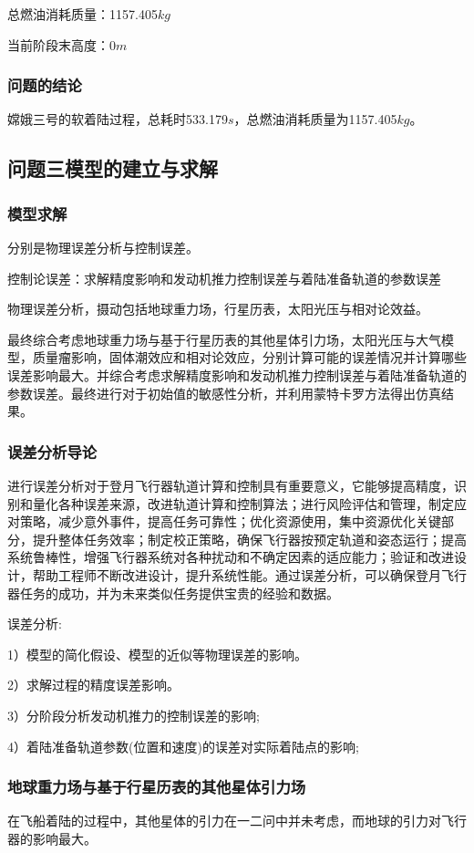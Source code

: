 \documentclass{ctexart}
\begin{document}
总燃油消耗质量：1157.405\(kg\)

当前阶段末高度：0\(m\)
\subsubsection{问题的结论}
嫦娥三号的软着陆过程，总耗时533.179\(s\)，总燃油消耗质量为1157.405\(kg\)。
    \subsection{问题三模型的建立与求解}
\subsubsection{模型求解}
分别是物理误差分析与控制误差。

控制论误差：求解精度影响和发动机推力控制误差与着陆准备轨道的参数误差

物理误差分析，摄动包括地球重力场，行星历表，太阳光压与相对论效益。

最终综合考虑地球重力场与基于行星历表的其他星体引力场，太阳光压与大气模型，质量瘤影响，固体潮效应和相对论效应，分别计算可能的误差情况并计算哪些误差影响最大。并综合考虑求解精度影响和发动机推力控制误差与着陆准备轨道的参数误差。最终进行对于初始值的敏感性分析，并利用蒙特卡罗方法得出仿真结果。
\subsubsection{误差分析导论}
进行误差分析对于登月飞行器轨道计算和控制具有重要意义，它能够提高精度，识别和量化各种误差来源，改进轨道计算和控制算法；进行风险评估和管理，制定应对策略，减少意外事件，提高任务可靠性；优化资源使用，集中资源优化关键部分，提升整体任务效率；制定校正策略，确保飞行器按预定轨道和姿态运行；提高系统鲁棒性，增强飞行器系统对各种扰动和不确定因素的适应能力；验证和改进设计，帮助工程师不断改进设计，提升系统性能。通过误差分析，可以确保登月飞行器任务的成功，并为未来类似任务提供宝贵的经验和数据。

误差分析:

1）模型的简化假设、模型的近似等物理误差的影响。



2）求解过程的精度误差影响。


3）分阶段分析发动机推力的控制误差的影响;

4）着陆准备轨道参数(位置和速度)的误差对实际着陆点的影响;
\subsubsection{地球重力场与基于行星历表的其他星体引力场}
在飞船着陆的过程中，其他星体的引力在一二问中并未考虑，而地球的引力对飞行器的影响最大。
\end{document}

